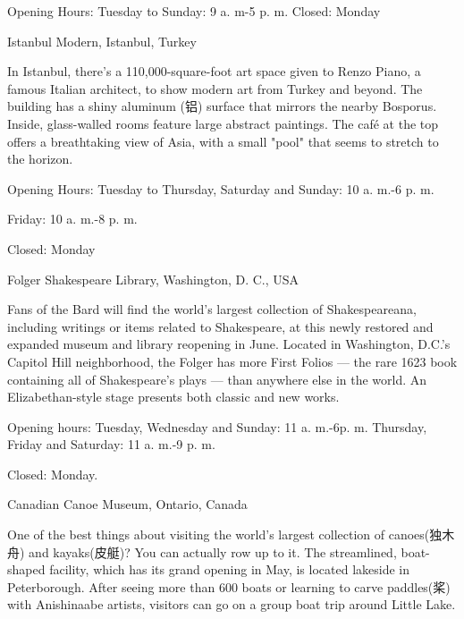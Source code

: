 \documentclass{英语试卷}
\begin{document}
\par Opening Hours: Tuesday to Sunday: 9 a. m-5 p. m. Closed: Monday\par
\par Istanbul Modern, Istanbul, Turkey\par
\par In Istanbul, there's a 110,000-square-foot art space given to Renzo Piano, a famous Italian architect, to show modern art from Turkey and beyond. The building has a shiny aluminum (铝) surface that mirrors the nearby Bosporus. Inside, glass-walled rooms feature large abstract paintings. The café at the top offers a breathtaking view of Asia, with a small "pool" that seems to stretch to the horizon.\par
\par Opening Hours: Tuesday to Thursday, Saturday and Sunday: 10 a. m.-6 p. m.\par
\par Friday: 10 a. m.-8 p. m.\par
\par Closed: Monday\par
\par Folger Shakespeare Library, Washington, D. C., USA\par
\par Fans of the Bard will find the world's largest collection of Shakespeareana, including writings or items related to Shakespeare, at this newly restored and expanded museum and library reopening in June. Located in Washington, D.C.'s Capitol Hill neighborhood, the Folger has more First Folios — the rare 1623 book containing all of Shakespeare's plays — than anywhere else in the world. An Elizabethan-style stage presents both classic and new works.\par
\par Opening hours: Tuesday, Wednesday and Sunday: 11 a. m.-6p. m. Thursday, Friday and Saturday: 11 a. m.-9 p. m.\par
\par Closed: Monday.\par
\par Canadian Canoe Museum, Ontario, Canada\par
\par One of the best things about visiting the world's largest collection of canoes(独木舟) and kayaks(皮艇)? You can actually row up to it. The streamlined, boat-shaped facility, which has its grand opening in May, is located lakeside in Peterborough. After seeing more than 600 boats or learning to carve paddles(桨) with Anishinaabe artists, visitors can go on a group boat trip around Little Lake.\par
\end{document}
